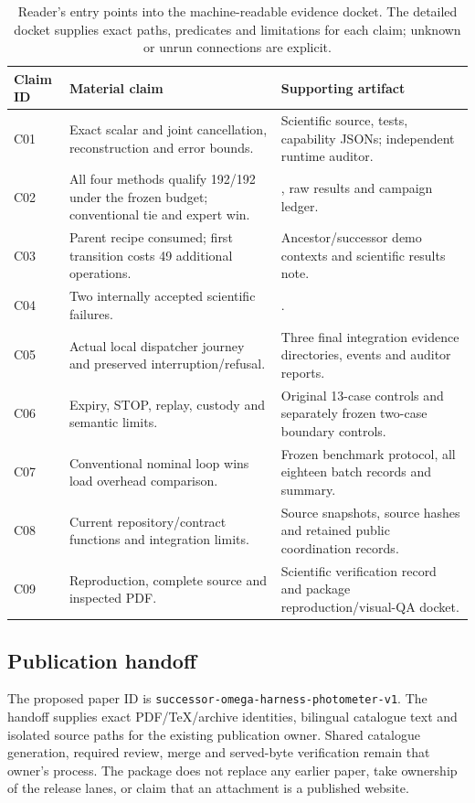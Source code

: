 \documentclass[11pt]{article}
\newcommand{\code}[1]{\texttt{#1}}
\begin{document}
\begin{table}[htbp]
\centering\small
\begin{tabularx}{\linewidth}{P{.16\linewidth}Y P{.37\linewidth}}
\toprule
\textbf{Claim ID} & \textbf{Material claim} & \textbf{Supporting artifact}\\
\midrule
C01 & Exact scalar and joint cancellation, reconstruction and error bounds. & Scientific source, tests, capability JSONs; independent runtime auditor.\\
C02 & All four methods qualify 192/192 under the frozen budget; conventional tie and expert win. & , raw results and campaign ledger.\\
C03 & Parent recipe consumed; first transition costs 49 additional operations. & Ancestor/successor demo contexts and scientific results note.\\
C04 & Two internally accepted scientific failures. & .\\
C05 & Actual local dispatcher journey and preserved interruption/refusal. & Three final integration evidence directories, events and auditor reports.\\
C06 & Expiry, STOP, replay, custody and semantic limits. & Original 13-case controls and separately frozen two-case boundary controls.\\
C07 & Conventional nominal loop wins load overhead comparison. & Frozen benchmark protocol, all eighteen batch records and summary.\\
C08 & Current repository/contract functions and integration limits. & Source snapshots, source hashes and retained public coordination records.\\
C09 & Reproduction, complete source and inspected PDF. & Scientific verification record and package reproduction/visual-QA docket.\\
\bottomrule
\end{tabularx}
\caption{Reader's entry points into the machine-readable evidence docket. The detailed docket supplies exact paths, predicates and limitations for each claim; unknown or unrun connections are explicit.}
\label{tab:docket}
\end{table}

\subsection{Publication handoff}

The proposed paper ID is \code{successor-omega-harness-photometer-v1}. The handoff supplies exact PDF/TeX/archive identities, bilingual catalogue text and isolated source paths for the existing publication owner. Shared catalogue generation, required review, merge and served-byte verification remain that owner's process. The package does not replace any earlier paper, take ownership of the release lanes, or claim that an attachment is a published website.
\end{document}

